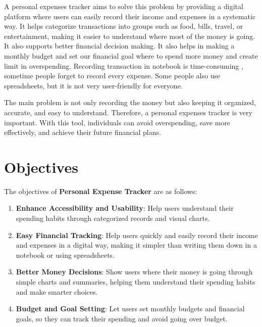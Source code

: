 \documentclass[12pt]{report} %
\begin{document}
A personal expenses tracker aims to solve this problem by providing a digital platform where
users can easily record their income and expenses in a systematic way. It helps categorize
transactions into groups such as food, bills, travel, or entertainment, making it easier to
understand where most of the money is going. It also supports better financial decision making.
It also helps in making a monthly budget and set our financial goal where to spend more money
and create limit in overspending. Recording transaction in notebook is time-consuming ,
sometime people forget to record every expense. Some people also use spreadsheets, but it is
not very user-friendly for everyone.

The main problem is not only recording the money but also keeping it organized, accurate, and
easy to understand. Therefore, a personal expenses tracker is very important. With this tool,
individuals can avoid overspending, save more effectively, and achieve their future financial
plans. \vspace{30pt}

\chapter{Objectives}
The objectives of \textbf{Personal Expense Tracker} are as follows:

\begin{enumerate}[label=\textbullet, topsep=2pt, partopsep=0pt, itemsep=2pt, parsep=0pt]
   \item \textbf{Enhance Accessibility and Usability}:
    Help users understand their spending habits through categorized records and visual charts.
    \item \textbf{Easy Financial Tracking}:
    Help users quickly and easily record their income and expenses in a digital way, making it simpler than writing them down in a notebook or using spreadsheets.
    \item \textbf{Better Money Decisions}: 
    Show users where their money is going through simple charts and summaries, helping them understand their spending habits and make smarter choices.
    \item \textbf{Budget and Goal Setting}:
    Let users set monthly budgets and financial goals, so they can track their spending and avoid going over budget.
\end{enumerate}

\hspace{30pt}

\end{document}

